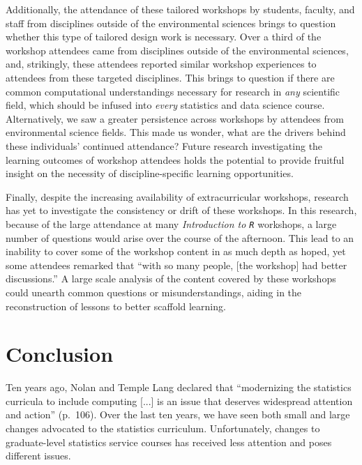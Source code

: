 \documentclass[12pt]{article}
\begin{document}
\quad Additionally, the attendance of these tailored workshops by students,
faculty, and staff from disciplines outside of the environmental sciences brings
to question whether this type of tailored design work is necessary. Over a third
of the workshop attendees came from disciplines outside of the environmental 
sciences, and, strikingly, these attendees reported similar workshop experiences
to attendees from these targeted disciplines. This brings to question if there
are common computational understandings necessary for research in \emph{any}
scientific field, which should be infused into \emph{every} statistics and data
science course. Alternatively, we saw a greater persistence across workshops by 
attendees from environmental science fields. This made us wonder, what are the
drivers behind these individuals' continued attendance? Future research 
investigating the learning outcomes of workshop attendees holds the potential to 
provide fruitful insight on the necessity of discipline-specific learning
opportunities. 

\quad Finally, despite the increasing availability of extracurricular 
workshops, research has yet to investigate the consistency or drift of these 
workshops. In this research, because of the large attendance at many
\emph{Introduction to \texttt{R}} workshops, a large number of questions would
arise over the course of the afternoon. This lead to an inability to cover some
of the workshop content in as much depth as hoped, yet some attendees remarked 
that ``with so many people, [the workshop] had better discussions.'' A large 
scale analysis of the content covered by these workshops could unearth common
questions or misunderstandings, aiding in the reconstruction of lessons to
better scaffold learning. 

\section{Conclusion}
\label{sec:conclusion}

\quad Ten years ago, Nolan and Temple Lang declared that ``modernizing the
statistics curricula to include computing [...] is an issue that deserves
widespread attention and action'' (p.\ 106). Over the last ten years, we have
seen both small \citep{gaise} and large \citep{asa} changes advocated to the
statistics curriculum. Unfortunately, changes to graduate-level statistics
service courses has received less attention and poses different issues. 
\end{document}
